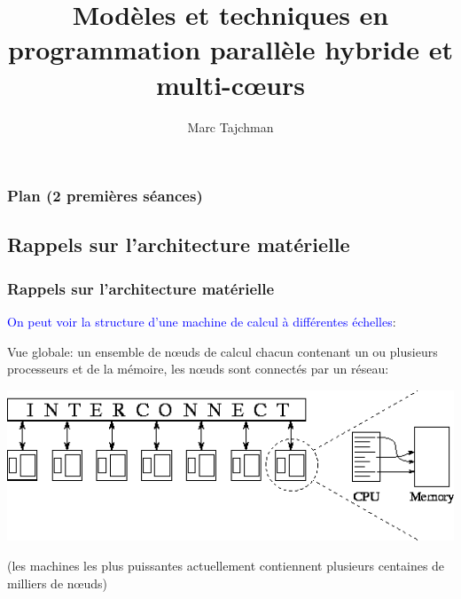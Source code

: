 \documentclass{beamer}
\title{Modèles et techniques en programmation parallèle hybride et multi-c\oe urs}
\author{Marc Tajchman}\institute{CEA - DEN/DM2S/STMF/LMES}
\begin{document}
\begin{frame}
\titlepage
\end{frame}

\Large
\begin{frame}
  	\frametitle{Plan (2 premières s\'eances)}
  	\tableofcontents
\end{frame}

\begin{frame}
\section{Rappels sur l'architecture mat\'erielle}
\frametitle{Rappels sur l'architecture mat\'erielle}
\textcolor{blue}{On peut voir la structure d'une machine de calcul \`a diff\'erentes \'echelles}:
\vfill

Vue globale: un ensemble de n\oe uds de calcul chacun contenant un ou plusieurs processeurs et de la m\'emoire, les n\oe uds sont connect\'es par un r\'eseau:

\vfill
\begin{center}
\includegraphics[scale=0.4]{img100}
\end{center}

(les machines les plus puissantes actuellement contiennent plusieurs centaines de milliers de n\oe uds)
\end{frame}
\end{document}
